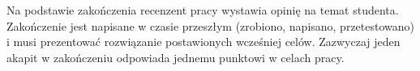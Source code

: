Na podstawie zakończenia recenzent pracy wystawia opinię na temat studenta. Zakończenie jest napisane w czasie przeszłym (zrobiono, napisano, przetestowano) i musi prezentować rozwiązanie postawionych wcześniej celów. Zazwyczaj jeden akapit w zakończeniu odpowiada jednemu punktowi w celach pracy.
